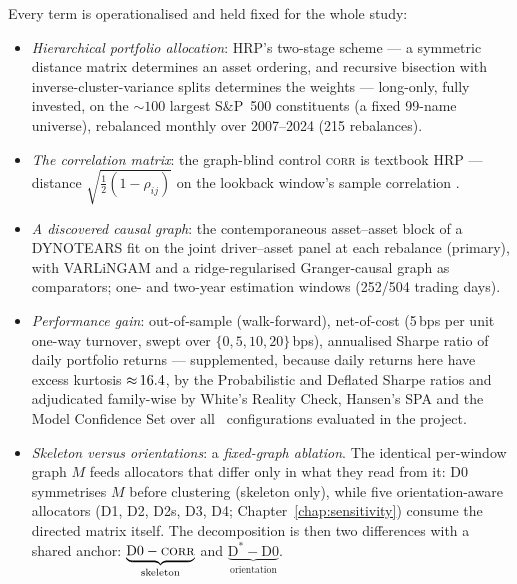 \noindent Every term is operationalised and held fixed for the whole study:
\begin{itemize}[itemsep=1pt, topsep=3pt]
  \item \emph{Hierarchical portfolio allocation}: HRP's two-stage scheme ---
    a symmetric distance matrix determines an asset ordering, and recursive
    bisection with inverse-cluster-variance splits determines the weights ---
    long-only, fully invested, on the ${\sim}100$ largest S\&P~500
    constituents (a fixed 99-name universe), rebalanced monthly over
    2007--2024 (215 rebalances).
  \item \emph{The correlation matrix}: the graph-blind control \textsc{corr}
    is textbook HRP --- distance $\sqrt{\tfrac{1}{2}(1-\rho_{ij})}$ on the
    lookback window's sample correlation \cite{lopezdeprado2016hrp}.
  \item \emph{A discovered causal graph}: the contemporaneous asset--asset
    block of a DYNOTEARS fit on the joint driver--asset panel at each
    rebalance (primary), with VARLiNGAM \cite{hyvarinen2010varlingam} and a
    ridge-regularised Granger-causal graph \cite{granger1969investigating} as
    comparators; one- and two-year estimation windows (252/504 trading days).
  \item \emph{Performance gain}: out-of-sample (walk-forward), net-of-cost
    (5\,bps per unit one-way turnover, swept over $\{0,5,10,20\}$\,bps),
    annualised Sharpe ratio of daily portfolio returns --- supplemented,
    because daily returns here have excess kurtosis
    ${\approx}\,16.4$, by the Probabilistic and Deflated Sharpe ratios
    \cite{bailey2012psr,bailey2014deflated} and adjudicated family-wise by
    White's Reality Check, Hansen's SPA and the Model Confidence Set
    \cite{white2000reality,hansen2005spa,hansen2011mcs} over all \rsNtrials\
    configurations evaluated in the project.
  \item \emph{Skeleton versus orientations}: a \emph{fixed-graph ablation}.
    The identical per-window graph $M$ feeds allocators that differ only in
    what they read from it: D0 symmetrises $M$ before clustering (skeleton
    only), while five orientation-aware allocators (D1, D2, D2s, D3, D4;
    Chapter~\ref{chap:sensitivity}) consume the directed matrix itself. The
    decomposition is then two differences with a shared anchor:
    $\underbrace{\text{D0}-\textsc{corr}}_{\text{skeleton}}$ and
    $\underbrace{\text{D}^{*}-\text{D0}}_{\text{orientation}}$.
\end{itemize}

